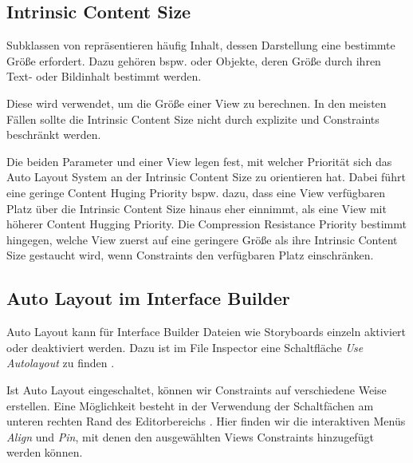 \documentclass[parskip=half, final]{scrreprt}
\begin{document}
\subsection{Intrinsic Content Size}

Subklassen von  repräsentieren häufig Inhalt, dessen Darstellung eine bestimmte Größe erfordert. Dazu gehören bspw.  oder  Objekte, deren Größe durch ihren Text- oder Bildinhalt bestimmt werden.

Diese  wird verwendet, um die Größe einer View zu berechnen. In den meisten Fällen sollte die Intrinsic Content Size nicht durch explizite  und  Constraints beschränkt werden.

Die beiden Parameter  und  einer View legen fest, mit welcher Priorität sich das Auto Layout System an der Intrinsic Content Size zu orientieren hat. Dabei führt eine geringe Content Huging Priority bspw. dazu, dass eine View verfügbaren Platz über die Intrinsic Content Size hinaus eher einnimmt, als eine View mit höherer Content Hugging Priority. Die Compression Resistance Priority bestimmt hingegen, welche View zuerst auf eine geringere Größe als ihre Intrinsic Content Size gestaucht wird, wenn Constraints den verfügbaren Platz einschränken.

\subsection{Auto Layout im Interface Builder}

Auto Layout kann für Interface Builder Dateien wie Storyboards einzeln aktiviert oder deaktiviert werden. Dazu ist im File Inspector eine Schaltfläche \emph{Use Autolayout} zu finden .


Ist Auto Layout eingeschaltet, können wir Constraints auf verschiedene Weise erstellen. Eine Möglichkeit besteht in der Verwendung der Schaltfächen am unteren rechten Rand des Editorbereichs . Hier finden wir die interaktiven Menüs \emph{Align} und \emph{Pin}, mit denen den ausgewählten Views Constraints hinzugefügt werden können.

\end{document}
